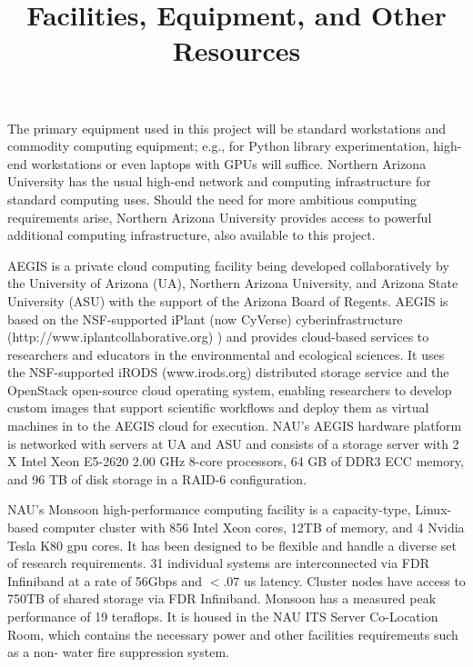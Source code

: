 \documentclass{article}
\title{Facilities, Equipment, and Other Resources}
\date{}
\begin{document}
\maketitle

The primary equipment used in this project will be standard workstations and commodity computing equipment; e.g., for Python library experimentation, high-end workstations or even laptops with GPUs will suffice. Northern Arizona University has the usual high-end network and computing infrastructure for standard computing uses.  Should the need for more ambitious computing requirements arise, Northern Arizona University provides access to powerful additional computing infrastructure, also available to this project.

AEGIS is a private cloud computing facility being developed collaboratively by the University of Arizona (UA), Northern Arizona University, and Arizona State University (ASU) with the support of the Arizona Board of Regents. AEGIS is based on the NSF-supported iPlant (now CyVerse) cyberinfrastructure (http://www.iplantcollaborative.org) ) and provides cloud-based services to researchers and educators in the environmental and ecological sciences. It uses the NSF-supported iRODS (www.irods.org) distributed storage service and the OpenStack open-source cloud operating system, enabling researchers to develop custom images that support scientific workflows and deploy them as virtual machines in to the AEGIS cloud for execution. NAU’s AEGIS hardware platform is networked with servers at UA and ASU and consists of a storage server with 2 X Intel Xeon E5-2620 2.00 GHz 8-core processors, 64 GB of DDR3 ECC memory, and 96 TB of disk storage in a RAID-6 configuration.

NAU’s Monsoon high-performance computing facility is a capacity-type, Linux-based computer cluster with 856 Intel Xeon cores, 12TB of memory, and 4 Nvidia Tesla K80 gpu cores. It has been designed to be flexible and handle a diverse set of research requirements. 31 individual systems are interconnected via FDR Infiniband at a rate of 56Gbps and $<.07$ us latency. Cluster nodes have access to 750TB of shared storage via FDR Infiniband. Monsoon has a measured peak performance of 19 teraflops. It is housed in the NAU ITS Server Co-Location Room, which contains the necessary power and other facilities requirements such as a non- water fire suppression system.
\end{document}

